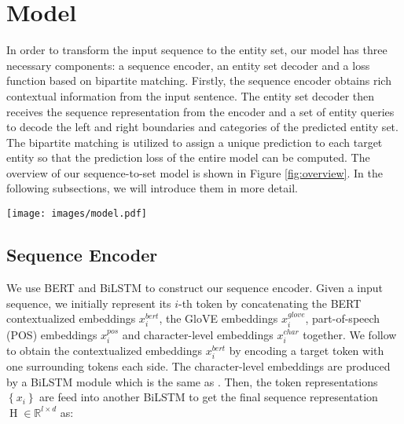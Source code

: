 \documentclass{article}
\begin{document}
\section{Model}
In order to transform the input sequence to the entity set, our model has three necessary components: a sequence encoder, an entity set decoder and a loss function based on bipartite matching. Firstly, the sequence encoder obtains rich contextual information from the input sentence. The entity set decoder then receives the sequence representation from the encoder and a set of entity queries to decode the left and right boundaries and categories of the predicted entity set. The bipartite matching is utilized to assign a unique prediction to each target entity so that the prediction loss of the entire model can be computed. The overview of our sequence-to-set model is shown in Figure \ref{fig:overview}. In the following subsections, we will introduce them in more detail.

\begin{figure*}[h]
  \centering
  \texttt{[image: images/model.pdf]}
  \caption{The architecture of our Sequence-to-Set Network. The representation of each token in sentence ``\textit{Some 2,500 Republican Guard forces surrendered.}" is fed into the entity set decoder along with the entity queries.
  Then the decoder transforms the queries to predicted entities. Finally, we score them by the loss function based on bipartite matching.}
   \label{fig:overview}
\end{figure*}

\subsection{Sequence Encoder}
We use BERT \cite{devlin-etal-2019-bert} and BiLSTM \cite{huang2015bidirectional} to construct our sequence encoder. Given a input sequence,  we initially represent its $i$-th token by concatenating the BERT contextualized embeddings $x^{bert}_i$, the GloVE \cite{pennington-etal-2014-glove} embeddings $x^{glove}_i$, part-of-speech (POS) embeddings $x^{pos}_i$ and character-level embeddings $x^{char}_i$ together. We follow \citep{yu2020named} to obtain the contextualized embeddings $x^{bert}_i$ by encoding a target token with one surrounding tokens each side. The character-level embeddings are produced by a BiLSTM module which is the same as \citep{lample2016neural}. Then, the token representations $\left\{x_i\right\}$ are feed into another BiLSTM to get the final sequence representation $\operatorname{H} \in \mathbb{R}^{l \times d}$ as:
\end{document}
